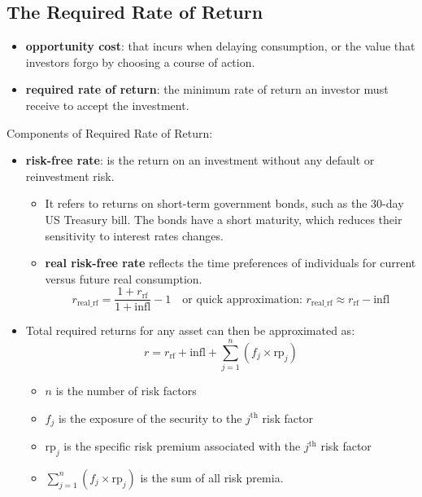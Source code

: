\subsection{The Required Rate of Return}
	\label{subsec:The Required Rate of Return}
\begin{itemize}
	\item \textbf{opportunity cost}: that incurs when delaying consumption, or the value that investors forgo by choosing a course of action.
	\item \textbf{required rate of return}: the minimum rate of return an investor must receive to accept the investment.
\end{itemize}
Components of Required Rate of Return:
\begin{itemize}
	\item \textbf{risk-free rate}: is the return on an investment without any default or reinvestment risk.
	\begin{itemize}
		\item[] It refers to returns on short-term government bonds, such as the 30-day US Treasury bill. The bonds have a short maturity, which reduces their sensitivity to interest rates changes.
		\item[] \textbf{real risk-free rate} reflects the time preferences of individuals for current versus future real consumption.
		\begin{equation}
			r_{\text{real\_rf}} = \frac{1 + r_{\text{rf}}}{1 + \text{infl}} - 1 \quad \text{or quick approximation: } r_{\text{real\_rf}} \approx r_{\text{rf}} - \text{infl}
			\label{eq:real_risk_free}
		\end{equation}
	\end{itemize}
	\item Total required returns for any asset can then be approximated as:
	\begin{equation}
		r = r_{\text{rf}} + \text{infl} + \sum_{j=1}^{n} (f_j \times \text{rp}_j)
		\label{eq:required_return}
	\end{equation}
	\begin{itemize}
		\item[] $n$ is the number of risk factors
		\item[] $f_{j}$ is the exposure of the security to the $j^{\text{th}}$ risk factor
		\item[] $\text{rp}_j$ is the specific risk premium associated with the $j^{\text{th}}$ risk factor
		\item[] $\sum_{j=1}^{n} (f_j \times \text{rp}_j)$ is the sum of all risk premia.
	\end{itemize}
\end{itemize}

